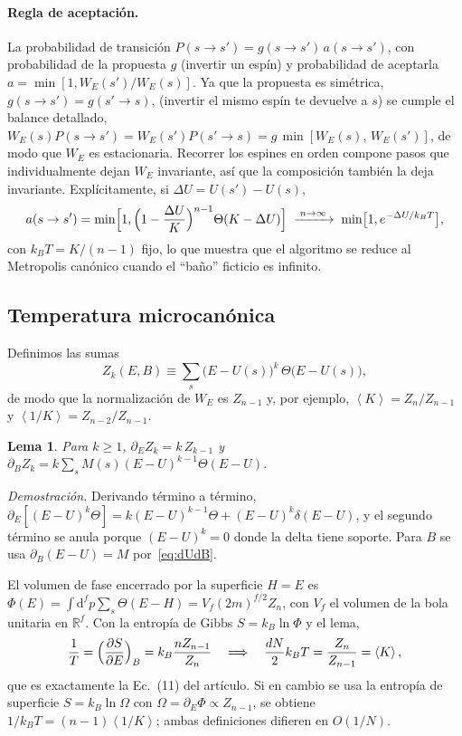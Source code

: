 \documentclass[11pt,letterpaper]{article}
\newcommand{\avg}[1]{\left\langle #1 \right\rangle}
\newcommand{\kB}{k_{B}}
\newcommand{\dd}{\mathrm{d}}
\newtheorem*{lema}{Lema}
\begin{document}
\paragraph{Regla de aceptación.} La probabilidad de transición
$P(s\to s')=g(s\to s')\,a(s\to s')$, con probabilidad de la propuesta $g$ (invertir un espín)
y probabilidad de aceptarla $a=\min[1,W_E(s')/W_E(s)]$. Ya que la propuesta es simétrica, $g(s\to s') = g(s'\to s)$, (invertir el mismo espín te devuelve a $s$) se cumple el balance detallado,
$W_E(s)P(s\to s')=W_E(s')P(s'\to s)=g\,\min[W_E(s),\,W_E(s')]$, de modo que $W_E$ es
estacionaria. Recorrer los espines en orden compone pasos que individualmente dejan
$W_E$ invariante, así que la composición también la deja invariante. Explícitamente,
si $\Delta U=U(s')-U(s)$,
\begin{equation}
a(s\to s')=\min\Bigl[1,\Bigl(1-\frac{\Delta U}{K}\Bigr)^{n-1}\Theta(K-\Delta U)\Bigr]
\;\xrightarrow{\;n\to\infty\;}\;\min\bigl[1,e^{-\Delta U/\kB T}\bigr],
\label{eq:acc}
\end{equation}
con $\kB T=K/(n-1)$ fijo, lo que muestra que el algoritmo se reduce al Metropolis
canónico cuando el ``baño'' ficticio es infinito.

\subsection{Temperatura microcanónica}
Definimos las sumas
\begin{equation}
Z_k(E,B)\equiv\sum_s\bigl(E-U(s)\bigr)^k\,\Theta\bigl(E-U(s)\bigr),
\end{equation}
de modo que la normalización de $W_E$ es $Z_{n-1}$ y, por ejemplo,
$\avg K=Z_n/Z_{n-1}$ y $\avg{1/K}=Z_{n-2}/Z_{n-1}$.

\begin{lema}
Para $k\ge1$, $\partial_EZ_k=k\,Z_{k-1}$ y $\partial_BZ_k=k\sum_sM(s)(E-U)^{k-1}\Theta(E-U)$.
\end{lema}
\noindent\emph{Demostración.} Derivando término a término,
$\partial_E[(E-U)^k\Theta]=k(E-U)^{k-1}\Theta+(E-U)^k\delta(E-U)$, y el segundo término se
anula porque $(E-U)^k=0$ donde la delta tiene soporte. Para $B$ se usa
$\partial_B(E-U)=M$ por~\eqref{eq:dUdB}. 

El volumen de fase encerrado por la superficie $H=E$ es
$\Phi(E)=\int\dd^fp\sum_s\Theta(E-H)=V_f(2m)^{f/2}Z_n$, con $V_f$ el volumen de la bola
unitaria en $\mathbb R^f$. Con la entropía de Gibbs $S=\kB\ln\Phi$ y el lema,
\begin{equation}
\frac1T=\Bigl(\frac{\partial S}{\partial E}\Bigr)_B=\kB\frac{nZ_{n-1}}{Z_n}
\quad\Longrightarrow\quad
\frac{dN}{2}\kB T=\frac{Z_n}{Z_{n-1}}=\avg K ,
\label{eq:T}
\end{equation}
que es exactamente la Ec.~(11) del artículo. Si en cambio se usa la entropía de
superficie $S=\kB\ln\Omega$ con $\Omega=\partial_E\Phi\propto Z_{n-1}$, se obtiene
$1/\kB T=(n-1)\avg{1/K}$; ambas definiciones difieren en $O(1/N)$.
\end{document}
